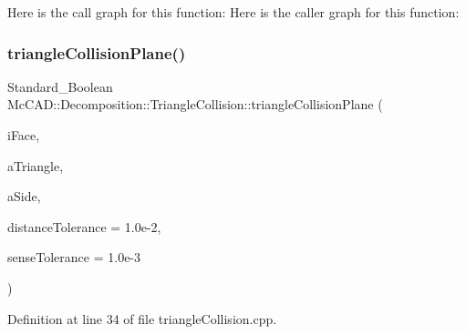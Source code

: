 Here is the call graph for this function\+:
Here is the caller graph for this function\+:
\mbox{\label{classMcCAD_1_1Decomposition_1_1TriangleCollision_aa9f5d8a29c70ea403e8a690108c31cc7}} 
\subsubsection{\texorpdfstring{triangle\+Collision\+Plane()}{triangleCollisionPlane()}\hspace{0.1cm}{\footnotesize\ttfamily [1/2]}}
{\footnotesize\ttfamily Standard\+\_\+\+Boolean Mc\+C\+A\+D\+::\+Decomposition\+::\+Triangle\+Collision\+::triangle\+Collision\+Plane (\begin{DoxyParamCaption}\item[{const \hyperlink{classMcCAD_1_1Geometry_1_1BoundSurface}{Mc\+C\+A\+D\+::\+Geometry\+::\+Bound\+Surface} \&}]{i\+Face,  }\item[{const \hyperlink{classMcCAD_1_1Geometry_1_1MeshTriangle}{Mc\+C\+A\+D\+::\+Geometry\+::\+Mesh\+Triangle} \&}]{a\+Triangle,  }\item[{Standard\+\_\+\+Integer \&}]{a\+Side,  }\item[{Standard\+\_\+\+Real}]{distance\+Tolerance = {\ttfamily 1.0e-\/2},  }\item[{Standard\+\_\+\+Real}]{sense\+Tolerance = {\ttfamily 1.0e-\/3} }\end{DoxyParamCaption})\hspace{0.3cm}{\ttfamily [private]}}



Definition at line 34 of file triangle\+Collision.\+cpp.


